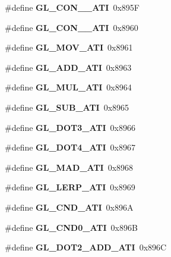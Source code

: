 \begin{DoxyCompactItemize}
\item 
\#define {\bfseries G\+L\+\_\+\+C\+O\+N\+\_\+\_\+\+A\+T\+I}~0x895\+F\label{_s_d_l__opengl_8h_a6d2a1b6757cb76d3ada3fd0993a73a1c}

\item 
\#define {\bfseries G\+L\+\_\+\+C\+O\+N\+\_\+\_\+\+A\+T\+I}~0x8960\label{_s_d_l__opengl_8h_a72de3f91d8961e115afa2d5e3598a16c}

\item 
\#define {\bfseries G\+L\+\_\+\+M\+O\+V\+\_\+\+A\+T\+I}~0x8961\label{_s_d_l__opengl_8h_ab5d4fb4c04dd90b7926ca60ed17554cd}

\item 
\#define {\bfseries G\+L\+\_\+\+A\+D\+D\+\_\+\+A\+T\+I}~0x8963\label{_s_d_l__opengl_8h_ad13af4783e71c99c23e4ff25b0c060f9}

\item 
\#define {\bfseries G\+L\+\_\+\+M\+U\+L\+\_\+\+A\+T\+I}~0x8964\label{_s_d_l__opengl_8h_adcd0fbd61ac319b737991b53b94bf82e}

\item 
\#define {\bfseries G\+L\+\_\+\+S\+U\+B\+\_\+\+A\+T\+I}~0x8965\label{_s_d_l__opengl_8h_a19136b45650535634aeee193ac3b3057}

\item 
\#define {\bfseries G\+L\+\_\+\+D\+O\+T3\+\_\+\+A\+T\+I}~0x8966\label{_s_d_l__opengl_8h_ab8259509dab91df9f25931e432941989}

\item 
\#define {\bfseries G\+L\+\_\+\+D\+O\+T4\+\_\+\+A\+T\+I}~0x8967\label{_s_d_l__opengl_8h_ad503bc95b3998bab00bf1d7114c32d2e}

\item 
\#define {\bfseries G\+L\+\_\+\+M\+A\+D\+\_\+\+A\+T\+I}~0x8968\label{_s_d_l__opengl_8h_a8d8562d90ab63ca2ef4da8f583da387e}

\item 
\#define {\bfseries G\+L\+\_\+\+L\+E\+R\+P\+\_\+\+A\+T\+I}~0x8969\label{_s_d_l__opengl_8h_a69a54a83efb7911721d1a2230d0f65bc}

\item 
\#define {\bfseries G\+L\+\_\+\+C\+N\+D\+\_\+\+A\+T\+I}~0x896\+A\label{_s_d_l__opengl_8h_a161a35ed7e6beea58db44c54c6d9f06b}

\item 
\#define {\bfseries G\+L\+\_\+\+C\+N\+D0\+\_\+\+A\+T\+I}~0x896\+B\label{_s_d_l__opengl_8h_a84c43b2f8917e365271277d06ff6d24b}

\item 
\#define {\bfseries G\+L\+\_\+\+D\+O\+T2\+\_\+\+A\+D\+D\+\_\+\+A\+T\+I}~0x896\+C\label{_s_d_l__opengl_8h_ae9c506d55f6a65eff2db79874c607f1f}


\end{DoxyCompactItemize}
